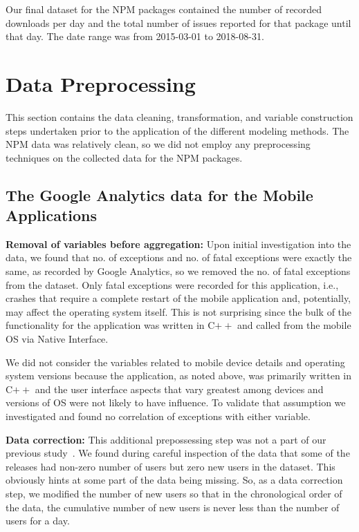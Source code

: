 \documentclass[smallextended]{svjour3}       %
\begin{document}
Our final dataset for the NPM packages contained the number of recorded downloads per day and the total number of issues reported for that package until that day. The date range was from 2015-03-01 to 2018-08-31. 


\section{Data Preprocessing}\label{s:datapre}

This section contains the data cleaning, transformation, and variable 
construction steps undertaken prior to the application of the different modeling 
methods. The NPM data was relatively clean, so we did not employ any preprocessing 
techniques on the collected data for the NPM packages. 

\subsection{The Google Analytics data for the Mobile Applications}

\textbf{Removal of variables before aggregation: } Upon initial
investigation into the data, we found that no. of exceptions and
no. of fatal exceptions were exactly the same, as recorded by Google
Analytics, so we removed the no. of fatal exceptions from the
dataset. Only fatal exceptions were recorded for this application,
i.e., crashes that require a complete restart of the mobile
application and, potentially, may affect the operating system
itself.  This is not surprising since the bulk of the functionality
for the application was written in C$++$ and called from the mobile OS
via Native Interface.

We did not consider the variables related to mobile device
details and operating system versions because the
application, as noted above, was primarily written in C$++$ and the
user interface aspects that vary greatest among devices and versions
of OS were not likely to have influence. To validate that
assumption we investigated and found no
correlation of exceptions with either variable. 

\noindent
\textbf{Data correction:}
This additional prepossessing step was not a part of our previous study~\cite{dey2018modeling}.
We found during careful inspection of the data that some of the releases had non-zero number
of users but zero new users in the dataset. This obviously hints at some part of the data 
being missing. So, as a data correction step, we modified the number of new users so that 
in the chronological order of the data, the cumulative number of new users is never 
less than the number of users for a day.
\end{document}
